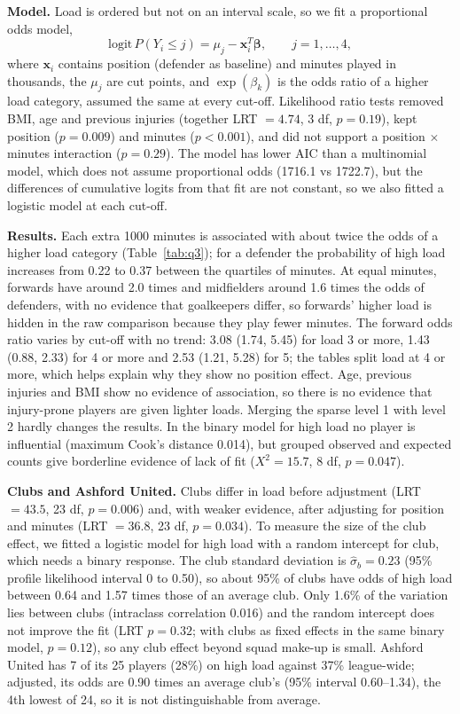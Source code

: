 \documentclass[11pt,a4paper]{article}
\begin{document}
\textbf{Model.} Load is ordered but not on an interval scale, so we fit a proportional odds model,
\[
\mathrm{logit}\,P(Y_i \le j) = \mu_j - \mathbf{x}_i^T\boldsymbol\beta, \qquad j=1,\dots,4,
\]
where $\mathbf{x}_i$ contains position (defender as baseline) and minutes played in thousands, the $\mu_j$ are cut points, and $\exp(\beta_k)$ is the odds ratio of a higher load category, assumed the same at every cut-off. Likelihood ratio tests removed BMI, age and previous injuries (together LRT $=4.74$, 3 df, $p=0.19$), kept position ($p=0.009$) and minutes ($p<0.001$), and did not support a position $\times$ minutes interaction ($p=0.29$). The model has lower AIC than a multinomial model, which does not assume proportional odds (1716.1 vs 1722.7), but the differences of cumulative logits from that fit are not constant, so we also fitted a logistic model at each cut-off.

\textbf{Results.} Each extra 1000 minutes is associated with about twice the odds of a higher load category (Table~\ref{tab:q3}); for a defender the probability of high load increases from 0.22 to 0.37 between the quartiles of minutes. At equal minutes, forwards have around 2.0 times and midfielders around 1.6 times the odds of defenders, with no evidence that goalkeepers differ, so forwards' higher load is hidden in the raw comparison because they play fewer minutes. The forward odds ratio varies by cut-off with no trend: 3.08 (1.74, 5.45) for load 3 or more, 1.43 (0.88, 2.33) for 4 or more and 2.53 (1.21, 5.28) for 5; the tables split load at 4 or more, which helps explain why they show no position effect. Age, previous injuries and BMI show no evidence of association, so there is no evidence that injury-prone players are given lighter loads. Merging the sparse level 1 with level 2 hardly changes the results. In the binary model for high load no player is influential (maximum Cook's distance 0.014), but grouped observed and expected counts give borderline evidence of lack of fit ($X^2=15.7$, 8 df, $p=0.047$).

\textbf{Clubs and Ashford United.} Clubs differ in load before adjustment (LRT $=43.5$, 23 df, $p=0.006$) and, with weaker evidence, after adjusting for position and minutes (LRT $=36.8$, 23 df, $p=0.034$). To measure the size of the club effect, we fitted a logistic model for high load with a random intercept for club, which needs a binary response. The club standard deviation is $\hat\sigma_b=0.23$ (95\% profile likelihood interval 0 to 0.50), so about 95\% of clubs have odds of high load between 0.64 and 1.57 times those of an average club. Only 1.6\% of the variation lies between clubs (intraclass correlation 0.016) and the random intercept does not improve the fit (LRT $p=0.32$; with clubs as fixed effects in the same binary model, $p=0.12$), so any club effect beyond squad make-up is small. Ashford United has 7 of its 25 players (28\%) on high load against 37\% league-wide; adjusted, its odds are 0.90 times an average club's (95\% interval 0.60--1.34), the 4th lowest of 24, so it is not distinguishable from average.
\end{document}
